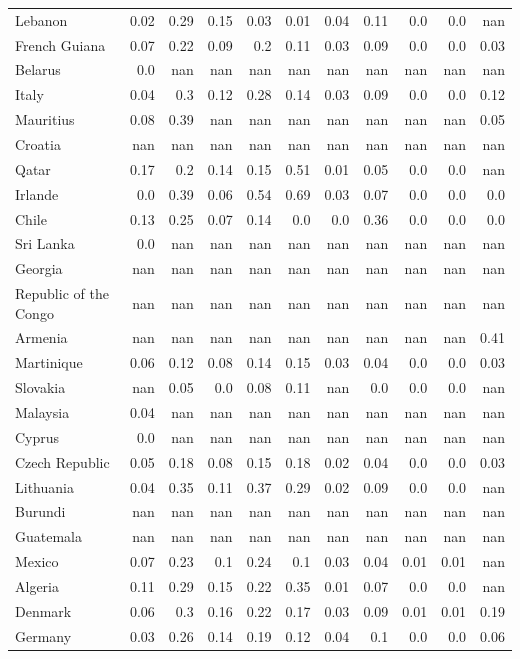 \documentclass[11pt]{article}
\begin{document}
\begin{center}
\begin{longtable}{|p{70pt}|r|r|r|r|r|r|r|r|r|r|}
Lebanon& 0.02& 0.29& 0.15& 0.03& 0.01& 0.04& 0.11& 0.0& 0.0& nan\\
French Guiana& 0.07& 0.22& 0.09& 0.2& 0.11& 0.03& 0.09& 0.0& 0.0& 0.03\\
Belarus& 0.0& nan& nan& nan& nan& nan& nan& nan& nan& nan\\
Italy& 0.04& 0.3& 0.12& 0.28& 0.14& 0.03& 0.09& 0.0& 0.0& 0.12\\
Mauritius& 0.08& 0.39& nan& nan& nan& nan& nan& nan& nan& 0.05\\
Croatia& nan& nan& nan& nan& nan& nan& nan& nan& nan& nan\\
Qatar& 0.17& 0.2& 0.14& 0.15& 0.51& 0.01& 0.05& 0.0& 0.0& nan\\
Irlande& 0.0& 0.39& 0.06& 0.54& 0.69& 0.03& 0.07& 0.0& 0.0& 0.0\\
Chile& 0.13& 0.25& 0.07& 0.14& 0.0& 0.0& 0.36& 0.0& 0.0& 0.0\\
Sri Lanka& 0.0& nan& nan& nan& nan& nan& nan& nan& nan& nan\\
Georgia& nan& nan& nan& nan& nan& nan& nan& nan& nan& nan\\
Republic of the Congo& nan& nan& nan& nan& nan& nan& nan& nan& nan& nan\\
Armenia& nan& nan& nan& nan& nan& nan& nan& nan& nan& 0.41\\
Martinique& 0.06& 0.12& 0.08& 0.14& 0.15& 0.03& 0.04& 0.0& 0.0& 0.03\\
Slovakia& nan& 0.05& 0.0& 0.08& 0.11& nan& 0.0& 0.0& 0.0& nan\\
Malaysia& 0.04& nan& nan& nan& nan& nan& nan& nan& nan& nan\\
Cyprus& 0.0& nan& nan& nan& nan& nan& nan& nan& nan& nan\\
Czech Republic& 0.05& 0.18& 0.08& 0.15& 0.18& 0.02& 0.04& 0.0& 0.0& 0.03\\
Lithuania& 0.04& 0.35& 0.11& 0.37& 0.29& 0.02& 0.09& 0.0& 0.0& nan\\
Burundi& nan& nan& nan& nan& nan& nan& nan& nan& nan& nan\\
Guatemala& nan& nan& nan& nan& nan& nan& nan& nan& nan& nan\\
Mexico& 0.07& 0.23& 0.1& 0.24& 0.1& 0.03& 0.04& 0.01& 0.01& nan\\
Algeria& 0.11& 0.29& 0.15& 0.22& 0.35& 0.01& 0.07& 0.0& 0.0& nan\\
Denmark& 0.06& 0.3& 0.16& 0.22& 0.17& 0.03& 0.09& 0.01& 0.01& 0.19\\
Germany& 0.03& 0.26& 0.14& 0.19& 0.12& 0.04& 0.1& 0.0& 0.0& 0.06\\

\end{longtable}
\end{center}
\end{document}
